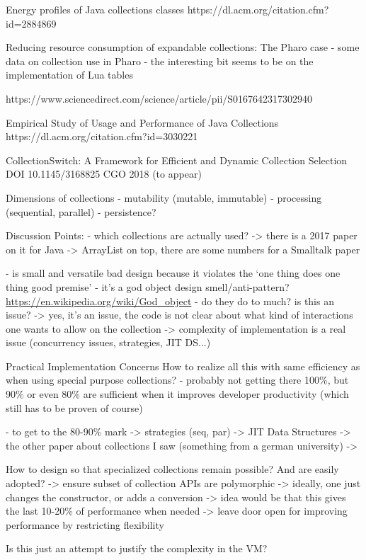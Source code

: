 \documentclass[sigconf, 10pt, review]{acmart}
\begin{document}
\begin{note}
Energy profiles of Java collections classes
https://dl.acm.org/citation.cfm?id=2884869

Reducing resource consumption of expandable collections: The Pharo case
- some data on collection use in Pharo
- the interesting bit seems to be on the implementation of Lua tables

https://www.sciencedirect.com/science/article/pii/S0167642317302940

Empirical Study of Usage and Performance of Java Collections
https://dl.acm.org/citation.cfm?id=3030221


CollectionSwitch: A Framework for Efficient and Dynamic Collection Selection
DOI 10.1145/3168825
CGO 2018 (to appear)






Dimensions of collections
- mutability (mutable, immutable)
- processing (sequential, parallel)
- persistence?

Discussion Points:
- which collections are actually used?
 -> there is a 2017 paper on it for Java
 -> ArrayList on top, there are some numbers for a Smalltalk paper
 

 - is small and versatile bad design because it violates the `one thing does one thing good premise'
   - it's a god object design smell/anti-pattern?
    \url{https://en.wikipedia.org/wiki/God_object}
    - do they do to much? is this an issue?
     -> yes, it's an issue, the code is not clear about what kind of 
        interactions one wants to allow on the collection
     -> complexity of implementation is a real issue (concurrency issues,
        strategies, JIT DS...)

Practical Implementation Concerns
 How to realize all this with same efficiency as when using special purpose
 collections?
 - probably not getting there 100\%, but 90\% or even 80\% are sufficient
   when it improves developer productivity (which still has to be proven of course)
  
 - to get to the 80-90\% mark
  -> strategies (seq, par)
  -> JIT Data Structures
     -> the other paper about collections I saw (something from a german university)
  ->

How to design so that specialized collections remain possible?
And are easily adopted?
 -> ensure subset of collection APIs are polymorphic
   -> ideally, one just changes the constructor, or adds a conversion
   -> idea would be that this gives the last 10-20\% of performance when needed
   -> leave door open for improving performance by restricting flexibility


Is this just an attempt to justify the complexity in the VM?

\end{note} 

% 



\end{document}
